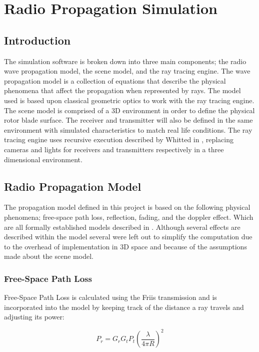 \chapter{Radio Propagation Simulation} \label{ch:radio_propagation}

\section{Introduction}
The simulation software is broken down into three main components; the radio wave propagation model, the scene model, and the ray tracing engine. The wave propagation model is a collection of equations that describe the physical phenomena that affect the propagation when represented by rays. The model used is based upon classical geometric optics to work with the ray tracing engine. The scene model is comprised of a 3D environment in order to define the physical rotor blade surface. The receiver and transmitter will also be defined in the same environment with simulated characteristics to match real life conditions. The ray tracing engine uses recursive execution described by Whitted in \cite{Whitted1979}, replacing cameras and lights for receivers and transmitters respectively in a three dimensional environment.

\section{Radio Propagation Model}
The propagation model defined in this project is based on the following physical phenomena; free-space path loss, reflection, fading, and the doppler effect. Which are all formally established models described in \cite{Bertoni1999, Parsons2000, Willis2005}. Although several effects are described within the model several were left out to simplify the computation due to the overhead of implementation in 3D space and because of the assumptions made about the scene model.

\subsection{Free-Space Path Loss}
Free-Space Path Loss is calculated using the Friis transmission and is incorporated into the model by keeping track of the distance a ray travels and adjusting its power:

\begin{equation}
	 P_r = G_r G_t P_t \left (\frac{\lambda}{4\pi R}\right)^2
	 \label{eqn:FSPL}
\end{equation}


